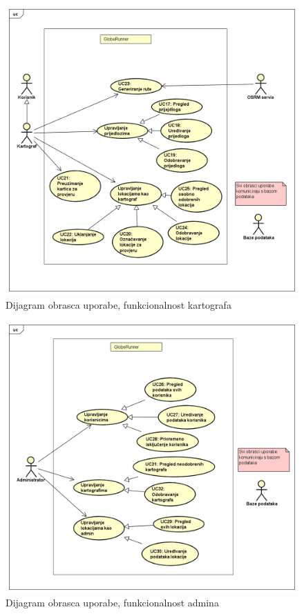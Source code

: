 				\begin{figure}[H]
        			\includegraphics[scale=0.5]{slike/UCDiagrami/kartograf.png} %
        			\centering
        			\caption{Dijagram obrasca uporabe, funkcionalnost kartografa}
        			\label{fig:promjene}
        		\end{figure}
					
				\begin{figure}[H]
        			\includegraphics[scale=0.5]{slike/UCDiagrami/admin.png} %
        			\centering
        			\caption{Dijagram obrasca uporabe, funkcionalnost admina}
        			\label{fig:promjene}
        		\end{figure}
				
